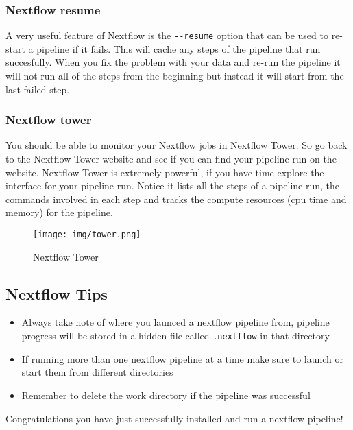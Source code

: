 \documentclass[11pt]{article}
\providecommand{\tightlist}{%
      \setlength{\itemsep}{0pt}\setlength{\parskip}{0pt}}
\begin{document}
    \hypertarget{nextflow-resume}{%
\subsubsection{Nextflow resume}\label{nextflow-resume}}

A very useful feature of Nextflow is the \texttt{-\/-resume} option that
can be used to re-start a pipeline if it fails. This will cache any
steps of the pipeline that run succesfully. When you fix the problem
with your data and re-run the pipeline it will not run all of the steps
from the beginning but instead it will start from the last failed step.

    \hypertarget{nextflow-tower}{%
\subsubsection{Nextflow tower}\label{nextflow-tower}}

You should be able to monitor your Nextflow jobs in Nextflow Tower. So
go back to the Nextflow Tower website and see if you can find your
pipeline run on the website. Nextflow Tower is extremely powerful, if
you have time explore the interface for your pipeline run. Notice it
lists all the steps of a pipeline run, the commands involved in each
step and tracks the compute resources (cpu time and memory) for the
pipeline.

    \begin{figure}
\centering
\texttt{[image: img/tower.png]}
\caption{Nextflow Tower}
\end{figure}

    \hypertarget{nextflow-tips}{%
\subsection{Nextflow Tips}\label{nextflow-tips}}

\begin{itemize}
\tightlist
\item
  Always take note of where you launced a nextflow pipeline from,
  pipeline progress will be stored in a hidden file called
  \texttt{.nextflow} in that directory
\item
  If running more than one nextflow pipeline at a time make sure to
  launch or start them from different directories
\item
  Remember to delete the work directory if the pipeline was successful
\end{itemize}

    Congratulations you have just successfully installed and run a nextflow
pipeline!


\end{document}

